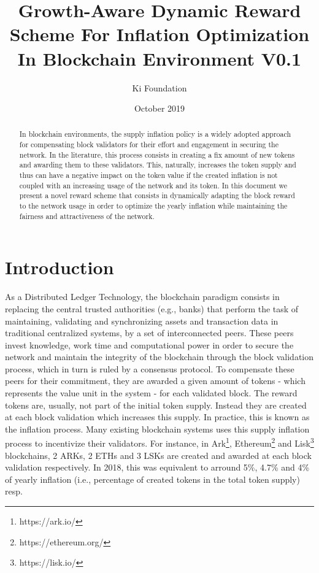 \documentclass[]{article}
\begin{document}
\title{Growth-Aware Dynamic Reward Scheme For Inflation Optimization In Blockchain Environment \small{V0.1}}

\author{Ki Foundation}
\date{October 2019}

\maketitle

\begin{abstract}
In blockchain environments, the supply inflation policy is a widely adopted approach for compensating block validators for their effort and engagement in securing the network. In the literature, this process consists in creating a fix amount of new tokens and awarding them to these validators. This, naturally, increases the token supply and thus can have a negative impact on the token value if the created inflation is not coupled with an increasing usage of the network and its token. In this document we present a novel reward scheme that consists in dynamically adapting the block reward to the network usage in order to optimize the yearly inflation while maintaining the fairness and attractiveness of the network.
\end{abstract}

\section{Introduction}
As a Distributed Ledger Technology, the blockchain paradigm consists in replacing the central trusted authorities (e.g., banks) that perform the task of maintaining, validating and synchronizing assets and transaction data in traditional centralized systems, by a set of interconnected peers. These peers invest knowledge, work time and computational power in order to secure the network and maintain the integrity of the blockchain through the block validation process, which in turn is ruled by a consensus protocol. To compensate these peers for their commitment, they are awarded a given amount of tokens - which represents the value unit in the system - for each validated block. The reward tokens are, usually, not part of the initial token supply. Instead they are created at each block validation which increases this supply. In practice, this is known as the inflation process. Many existing blockchain systems uses this supply inflation process to incentivize their validators. For instance, in Ark\footnote{https://ark.io/}, Ethereum\footnote{https://ethereum.org/} and Lisk\footnote{https://lisk.io/} blockchains, 2 ARKs, 2 ETHs and 3 LSKs are created and awarded at each block validation respectively. In 2018, this was equivalent to arround 5\%, 4.7\% and 4\% of yearly inflation (i.e., percentage of created tokens in the total token supply) resp.
\end{document}
